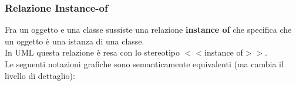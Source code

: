 \documentclass{article}
\begin{document}
	\subsubsection{Relazione Instance-of}
	Fra un oggetto e una classe sussiste una relazione \textbf{instance of} che specifica che un oggetto è una istanza di una classe.
	\vspace{\baselineskip} \\
	In UML questa relazione è resa con lo stereotipo $<<$instance of$>>$.
	\vspace{\baselineskip} \\
	Le seguenti notazioni grafiche sono semanticamente equivalenti (ma cambia il livello di dettaglio):
	\begin{figure}[h]
		\centering
		 \hfill
		\label{fig:subfig}
	\end{figure}
\end{document}
